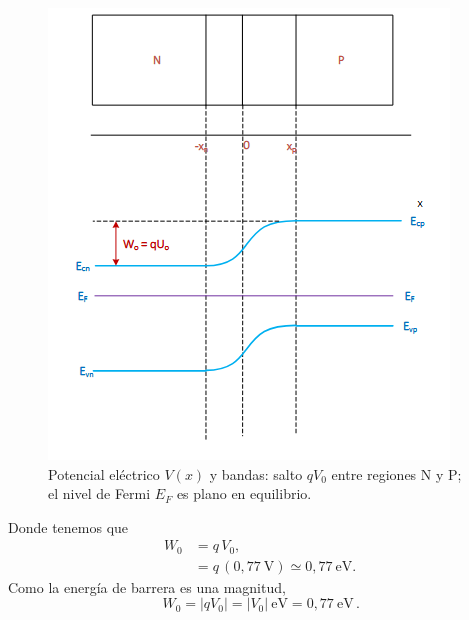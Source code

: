 \begin{figure}
    \centering
    \includegraphics[scale=1]{img/P1_8.png}
    \caption{Potencial eléctrico \(V(x)\) y bandas: salto \(qV_0\) entre regiones N y P; el nivel de Fermi \(E_F\) es plano en equilibrio.}
\end{figure}
Donde tenemos que 
\begin{align}
W_0 &= q\,V_0,\\
    &= q\,(0{,}77~\text{V}) \simeq 0{,}77~\text{eV}.
\end{align}
Como la energía de barrera es una magnitud,
\begin{equation}
\boxed{\,W_0 = |qV_0| = |V_0|~\text{eV} = 0{,}77~\text{eV}\, }.
\end{equation}
